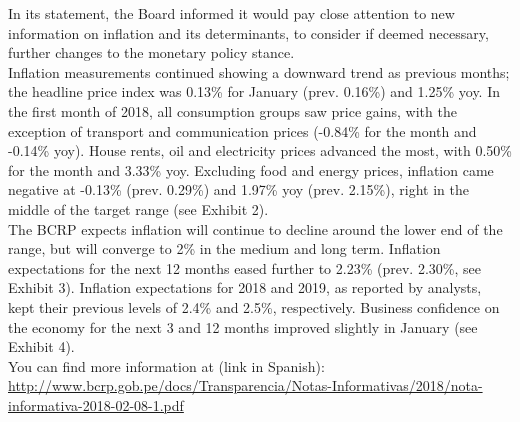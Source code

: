 \documentclass[final,a4paper]{report}
\begin{document}
\begin{vwcol}[widths={0.45,0.55},
 sep=.5cm, justify=flush,rule=0pt,indent=1em]
\begin{minipage}{0.50\textwidth}
{In its statement, the Board informed it would pay close attention to new information on inflation and its determinants, to consider if deemed necessary, further changes to the monetary policy stance.\\

Inflation measurements continued showing a downward trend as previous months; the headline price index was 0.13\% for January (prev. 0.16\%) and 1.25\% yoy. In the first month of 2018, all consumption groups saw price gains, with the exception of transport and communication prices (-0.84\% for the month and -0.14\% yoy). House rents, oil and electricity prices advanced the most, with 0.50\% for the month and 3.33\% yoy. Excluding food and energy prices, inflation came negative at -0.13\% (prev. 0.29\%) and 1.97\% yoy (prev. 2.15\%), right in the middle of the target range (see Exhibit 2).\\

The BCRP expects inflation will continue to decline around the lower end of the range, but will converge to 2\% in the medium and long term. Inflation expectations for the next 12 months eased further to 2.23\% (prev. 2.30\%, see Exhibit 3). Inflation expectations for 2018 and 2019, as reported by analysts, kept their previous levels of 2.4\% and 2.5\%, respectively. Business confidence on the economy for the next 3 and 12 months improved slightly in January (see Exhibit 4).\\

You can find more information at (link in Spanish):\\
\href{http://www.bcrp.gob.pe/docs/Transparencia/Notas-Informativas/2018/nota-informativa-2018-02-08-1.pdf}{http://www.bcrp.gob.pe/docs/Transparencia/Notas-Informativas/2018/nota-informativa-2018-02-08-1.pdf}
}
	\end{minipage} %
\end{vwcol}
	
\thispagestyle{firststyle}

	\newpage
	
\thispagestyle{main}
	
		
\end{document}
